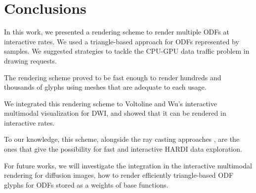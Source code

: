 \documentclass[twoside,twocolumn,10pt]{article}
\begin{document}




\section{Conclusions}
\label{sec::conclusions}

In this work, we presented a rendering scheme to render multiple ODFs at interactive rates. We used a triangle-based approach for ODFs represented by samples. We suggested strategies to tackle the  CPU-GPU data traffic problem in drawing requests.

The rendering scheme proved to be fast enough to render hundreds and thousands of glyphs using meshes that are adequate to each usage.

We integrated this rendering scheme to Voltoline and Wu's \cite{voltoline2021} interactive multimodal visualization for DWI, and showed that it can be rendered in interactive rates.

To our knowledge, this scheme, alongside the ray casting approaches \cite{peeters2009,almsick2011}, are the ones that give the possibility for fast and interactive HARDI data exploration.

For future works, we will investigate the integration in the interactive multimodal rendering for diffusion images, how to render efficiently triangle-based ODF glyphs for ODFs stored as a weights of base functions.














\end{document}
